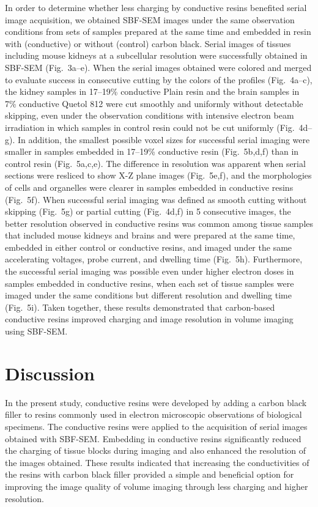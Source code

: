 \documentclass{article}
\begin{document}
In order to determine whether less charging by conductive resins benefited serial image acquisition, we obtained SBF-SEM images under the same observation conditions from sets of samples prepared at the same time and embedded in resin with (conductive) or without (control) carbon black. Serial images of tissues including mouse kidneys at a subcellular resolution were successfully obtained in SBF-SEM (Fig.~3a–e). When the serial images obtained were colored and merged to evaluate success in consecutive cutting by the colors of the profiles (Fig.~4a–c), the kidney samples in 17–19\% conductive Plain resin and the brain samples in 7\% conductive Quetol 812 were cut smoothly and uniformly without detectable skipping, even under the observation conditions with intensive electron beam irradiation in which samples in control resin could not be cut uniformly (Fig.~4d–g). In addition, the smallest possible voxel sizes for successful serial imaging were smaller in samples embedded in 17–19\% conductive resin (Fig.~5b,d,f) than in control resin (Fig.~5a,c,e). The difference in resolution was apparent when serial sections were resliced to show X-Z plane images (Fig.~5e,f), and the morphologies of cells and organelles were clearer in samples embedded in conductive resins (Fig.~5f). When successful serial imaging was defined as smooth cutting without skipping (Fig.~5g) or partial cutting (Fig.~4d,f) in 5 consecutive images, the better resolution observed in conductive resins was common among tissue samples that included mouse kidneys and brains and were prepared at the same time, embedded in either control or conductive resins, and imaged under the same accelerating voltages, probe current, and dwelling time (Fig.~5h). Furthermore, the successful serial imaging was possible even under higher electron doses in samples embedded in conductive resins, when each set of tissue samples were imaged under the same conditions but different resolution and dwelling time (Fig.~5i). Taken together, these results demonstrated that carbon-based conductive resins improved charging and image resolution in volume imaging using SBF-SEM.

\section*{Discussion}

In the present study, conductive resins were developed by adding a carbon black filler to resins commonly used in electron microscopic observations of biological specimens. The conductive resins were applied to the acquisition of serial images obtained with SBF-SEM. Embedding in conductive resins significantly reduced the charging of tissue blocks during imaging and also enhanced the resolution of the images obtained. These results indicated that increasing the conductivities of the resins with carbon black filler provided a simple and beneficial option for improving the image quality of volume imaging through less charging and higher resolution.
\end{document}
